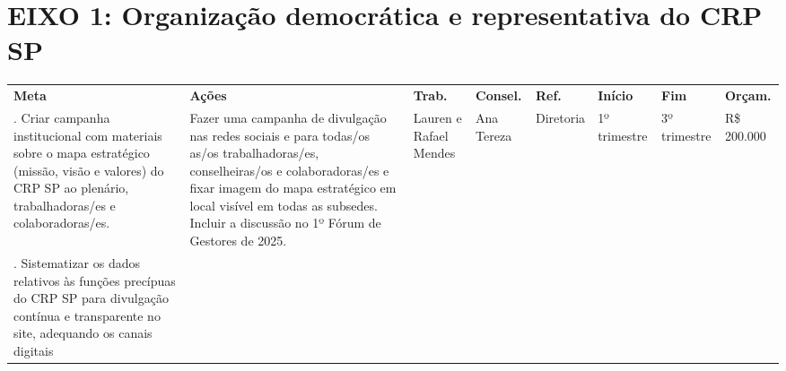 \documentclass[%
    oneside,
    a4paper,
    landscape,
    8pt
]{memoir}
\begin{document}
\chapter{EIXO 1: Organização democrática e representativa do CRP SP}

\begin{longtable}[]{@{}
  >{\centering\arraybackslash}p{}
  >{\centering\arraybackslash}p{}
  >{\centering\arraybackslash}p{}
  >{\centering\arraybackslash}p{}
  >{\centering\arraybackslash}p{}
  >{\centering\arraybackslash}p{}
  >{\centering\arraybackslash}p{}
  >{\centering\arraybackslash}p{}@{}}
  \toprule\noalign{}
  \endhead
  \bottomrule\noalign{}
  \endlastfoot
  \textbf{Meta}                                                       & \textbf{Ações}                                                   & \textbf{Trab.}                              & \textbf{Consel.} &
  \textbf{Ref.}                                                       & \textbf{Início}                                                  & \textbf{Fim}                                & \textbf{Orçam.}                                      \\
  1. Criar campanha institucional com materiais sobre o mapa estratégico
  (missão, visão e valores) do CRP SP ao plenário, trabalhadoras/es e
  colaboradoras/es.                                                   & Fazer uma campanha de divulgação nas redes sociais e
  para todas/os as/os trabalhadoras/es, conselheiras/os e colaboradoras/es
  e fixar imagem do mapa estratégico em local visível em todas as
  subsedes. Incluir a discussão no 1º Fórum de Gestores de 2025.      & Lauren
  e Rafael Mendes                                                     & Ana Tereza                                                       & Diretoria                                   & 1º trimestre     & 3º trimestre &
  R\$ 200.000                                                                                                                                                                                                                                 \\
  2. Sistematizar os dados relativos às funções precípuas do CRP SP para
  divulgação contínua e transparente no site, adequando os canais digitais

\end{longtable}
\end{document}
